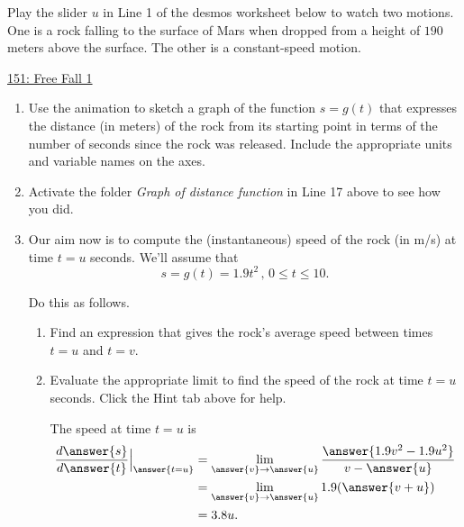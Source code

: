 \documentclass{ximera}
\begin{document}
\begin{exploration}  \label{Qvbbtrg43444}

Play the slider $u$ in Line 1 of the desmos worksheet below to watch two motions. One is a rock falling to the surface of Mars when dropped from a height of $190$ meters above the surface. The other is a constant-speed motion.

\begin{onlineOnly}
    \begin{center}
\end{center}
\end{onlineOnly}

\href{https://www.desmos.com/calculator/j2ciuemii7}{151: Free Fall 1}

\begin{enumerate}
\item Use the animation to sketch a graph of the function $s=g(t)$ that expresses the distance (in meters) of the rock from its starting point in terms of the number of seconds since the rock was released. Include the appropriate units and variable names on the axes.

\item Activate the folder \emph{Graph of distance function} in Line 17 above to see how you did.

\item Our aim now is to compute the (instantaneous) speed of the rock (in m/s) at time $t=u$ seconds. We'll assume that 
\[
      s = g(t) = 1.9t^2 \, , \, 0\leq t \leq 10.
\] 

Do this as follows.  

\begin{enumerate}
\item Find an expression that gives the rock's average speed between times $t=u$ and $t=v$.

\item Evaluate the appropriate limit to find the speed of the rock at time $t=u$ seconds. Click the Hint tab above for help.

\begin{hint}

The speed at time $t=u$ is
\begin{align*}
    \frac{d\answer{s}}{d\answer{t}} \Big|_{\answer{t=u}} &=      \lim_{\answer{v}\to \answer{u}} \frac{\answer{1.9v^2-1.9u^2}}{v-\answer{u}}   \\
                                                       & = \lim_{\answer{v}\to \answer{u}} 1.9(\answer{v+u}) \\
                                                       & = 3.8u .
 \end{align*}
\end{hint}


\end{enumerate}
\end{enumerate}
\end{exploration}
\end{document}
